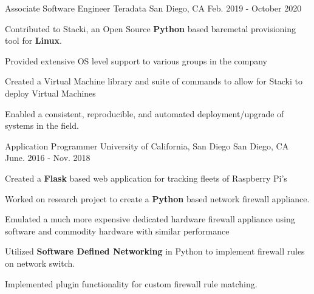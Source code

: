 

\begin{cventries}

  \cventry
    {Associate Software Engineer} %
    {Teradata} %
    {San Diego, CA} %
    {Feb. 2019 - October 2020} %
    {
      \begin{cvitems} %
        \item {Contributed to Stacki, an Open Source \textbf{Python} based baremetal provisioning tool for \textbf{Linux}.}
        \item{ Provided extensive OS level support to various groups in the company }
        \item {Created a Virtual Machine library and suite of commands to allow for Stacki to deploy Virtual Machines}
        \item {Enabled a consistent, reproducible, and automated deployment/upgrade of systems in the field.}
      \end{cvitems}
    }

  \cventry
    {Application Programmer} %
    {University of California, San Diego} %
    {San Diego, CA} %
    {June. 2016 - Nov. 2018} %
    {
      \begin{cvitems} %
        \item {Created a \textbf{Flask} based web application for tracking fleets of Raspberry Pi's }
        \item {Worked on research project to create a \textbf{Python} based network firewall appliance.}
        \item {Emulated a much more expensive dedicated hardware firewall appliance using software and commodity hardware with similar performance}
        \item {Utilized \textbf{Software Defined Networking} in Python to implement firewall rules on network switch.}
        \item {Implemented plugin functionality for custom firewall rule matching.}
      \end{cvitems}
    }


\end{cventries}
